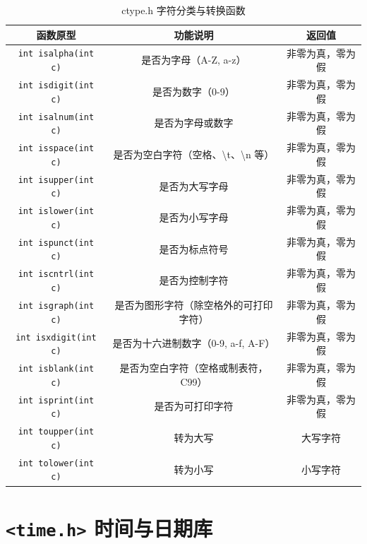 \begin{table}[H]
\centering
\renewcommand{\arraystretch}{1.6}
\begin{tabulary}{\linewidth}{CCC}
\toprule
\textbf{函数原型} & \textbf{功能说明} & \textbf{返回值} \\ \midrule
\texttt{int isalpha(int c)} & 是否为字母（A-Z, a-z） & 非零为真，零为假 \\ 
\texttt{int isdigit(int c)} & 是否为数字（0-9） & 非零为真，零为假 \\ 
\texttt{int isalnum(int c)} & 是否为字母或数字 & 非零为真，零为假 \\ 
\texttt{int isspace(int c)} & 是否为空白字符（空格、\textbackslash t、\textbackslash n 等） & 非零为真，零为假 \\ 
\texttt{int isupper(int c)} & 是否为大写字母 & 非零为真，零为假 \\ 
\texttt{int islower(int c)} & 是否为小写字母 & 非零为真，零为假 \\ 
\texttt{int ispunct(int c)} & 是否为标点符号 & 非零为真，零为假 \\ 
\texttt{int iscntrl(int c)} & 是否为控制字符 & 非零为真，零为假 \\ 
\texttt{int isgraph(int c)} & 是否为图形字符（除空格外的可打印字符） & 非零为真，零为假 \\ 
\texttt{int isxdigit(int c)} & 是否为十六进制数字（0-9, a-f, A-F） & 非零为真，零为假 \\ 
\texttt{int isblank(int c)} & 是否为空白字符（空格或制表符，C99） & 非零为真，零为假 \\ 
\texttt{int isprint(int c)} & 是否为可打印字符 & 非零为真，零为假 \\ 
\texttt{int toupper(int c)} & 转为大写 & 大写字符 \\ 
\texttt{int tolower(int c)} & 转为小写 & 小写字符 \\ \bottomrule
\end{tabulary}
\caption{ctype.h 字符分类与转换函数}
\label{tab:ctype_funcs}
\end{table}

\section{\texorpdfstring{\texttt{<time.h>} 时间与日期库}{<time.h> 时间与日期库}}

